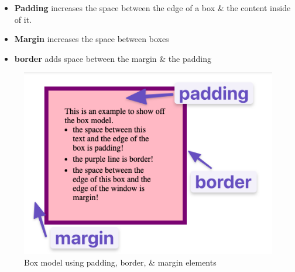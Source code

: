 \documentclass{article}
\begin{document}
	\begin{itemize}
		\item {\bf Padding} increases the space between the edge of a box \& the content inside of it.
		\item {\bf Margin} increases the space between boxes
		\item {\bf border} adds space between the margin \& the padding
	\end{itemize}

	\begin{figure}[H]
		\includegraphics[width=\linewidth]{OdinProjectPics/box-model.png}
		\caption{Box model using padding, border, \& margin elements}
		\label{Box model}
	\end{figure}
\end{document}
